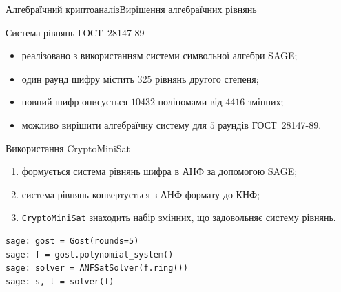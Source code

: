 \documentclass[10pt, ucs, handout]{beamer}
\begin{document}
\begin{frame}{Алгебраїчний криптоаналіз}{Вирішення алгебраїчних рівнянь}
    \small
    \begin{block}{Система рівнянь ГОСТ~28147-89}
        \begin{itemize}
            \item реалізовано з використанням системи символьної алгебри SAGE;
            \item один раунд шифру містить $325$ рівнянь другого степеня;
            \item повний шифр описується $10432$ поліномами від $4416$ змінних;
            \item можливо вирішити алгебраїчну систему для $5$ раундів ГОСТ~28147-89.
        \end{itemize}
    \end{block}

    \begin{block}{Використання CryptoMiniSat}
    \begin{enumerate}
        \item формується система рівнянь шифра в АНФ за допомогою SAGE;
        \item система рівнянь конвертується з АНФ формату до КНФ;
        \item \verb+CryptoMiniSat+ знаходить набір змінних, що задовольняє систему рівнянь. 
    \end{enumerate} 
    \end{block}
    \begin{example}
\begin{lstlisting}
sage: gost = Gost(rounds=5)
sage: f = gost.polynomial_system()
sage: solver = ANFSatSolver(f.ring())
sage: s, t = solver(f)
\end{lstlisting}
    \end{example}
\end{frame}
\end{document}
